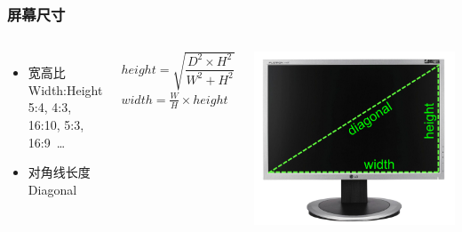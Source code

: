 \documentclass{beamer}
\newcommand{\fullPageImage}[2]{
	{
		\usebackgroundtemplate{\texttt{[image: \#1]}}
		\frame[plain]{#2}
	}
}
\begin{document}

\begin{frame}
	\frametitle{屏幕尺寸}
	\begin{columns}
	\begin{itemize}
		\item 宽高比 {\color{blue}W}idth:{\color{purple}H}eight\\5:4, 4:3, 16:10, 5:3, 16:9~\dots
		\item 对角线长度 {\color{green}D}iagonal
	\end{itemize}
	\begin{center}
	$ height=\sqrt{\dfrac{D^2 \times H^2}{W^2+H^2}} $\\
	$ width=\frac{W}{H} \times height $
	\end{center}
	\includegraphics[width=.9\textwidth]{images/697px-Display_size_measurements.png} %
	\end{columns}
\end{frame}

\fullPageImage{images/LCD_screen_sizes.svg.png}{\transwipe}%
\fullPageImage{images/749px-Vector_Video_Standards4.svg.png}{\transwipe}%
\end{document}
